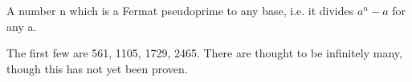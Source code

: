 A number n which is a Fermat pseudoprime to any base, i.e. it divides $a^{n}-a$  for any a. \par
The first few are 561, 1105, 1729, 2465. There are thought 
to be infinitely many, though this has not yet been proven.
